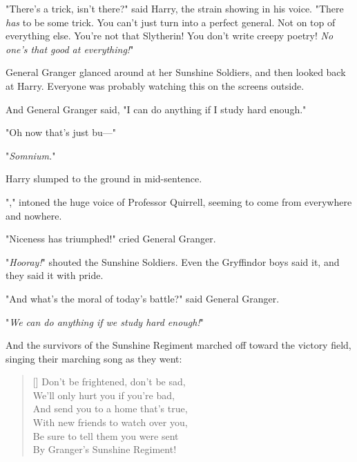 "There's a trick, isn't there?" said Harry, the strain showing in his voice.
"There \emph{has} to be some trick. You can't just turn into a perfect general.
Not on top of everything else. You're not that Slytherin! You don't write
creepy poetry! \emph{No one's that good at everything!}"

General Granger glanced around at her Sunshine Soldiers, and then looked back
at Harry. Everyone was probably watching this on the screens outside.

And General Granger said, "I can do anything if I study hard enough."

"Oh now that's just bu\mbox{---}"

"\emph{Somnium.}"

Harry slumped to the ground in mid-sentence.

"," intoned the huge voice of Professor Quirrell, seeming to come
from everywhere and nowhere.

"Niceness has triumphed!" cried General Granger.

"\emph{Hooray!}" shouted the Sunshine Soldiers. Even the Gryffindor boys said
it, and they said it with pride.

"And what's the moral of today's battle?" said General Granger.

"\emph{We can do anything if we study hard enough!}"

And the survivors of the Sunshine Regiment marched off toward the victory
field, singing their marching song as they went:

\begin{verse}[\versewidth]
Don't be frightened, don't be sad,\\
We'll only hurt you if you're bad,\\
And send you to a home that's true,\\
With new friends to watch over you,\\
Be sure to tell them you were sent\\
By Granger's Sunshine Regiment!
\end{verse}
